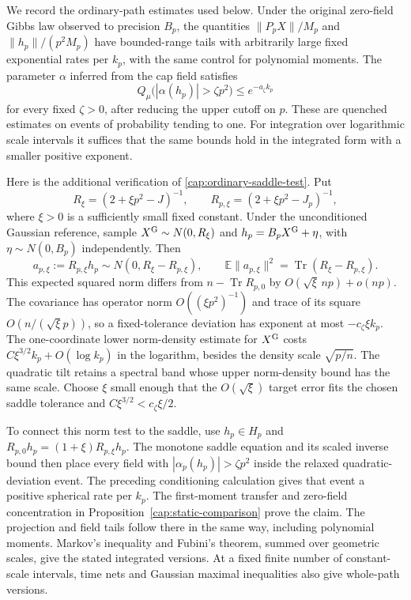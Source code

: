 We record the ordinary-path estimates used below. Under the original
zero-field Gibbs law observed to precision $B_p$, the quantities
$\|P_pX\|/M_p$ and $\|h_p\|/(p^2M_p)$ have bounded-range tails with
arbitrarily large fixed exponential rates per $k_p$, with the same control for
polynomial moments. The parameter $\alpha$ inferred from the cap field
satisfies
\begin{equation}\label{cap:ordinary-saddle-test}
 Q_\mu\big(|\alpha(h_p)|>\zeta p^2\big)
 \le e^{-a_\zeta k_p}
\end{equation}
for every fixed $\zeta>0$, after reducing the upper cutoff on $p$. These are
quenched estimates on events of probability tending to one. For integration
over logarithmic scale intervals it suffices that the same bounds hold in the
integrated form with a smaller positive exponent.

Here is the additional verification of \eqref{cap:ordinary-saddle-test}. Put
\[
 R_\xi=(2+\xi p^2-J)^{-1},\qquad
 R_{p,\xi}=(2+\xi p^2-J_p)^{-1},
\]
where $\xi>0$ is a sufficiently small fixed constant. Under the
unconditioned Gaussian reference, sample $X^{\rm G}\sim N(0,R_\xi)$ and
$h_p=B_pX^{\rm G}+\eta$, with $\eta\sim N(0,B_p)$ independently. Then
\[
 a_{p,\xi}:=R_{p,\xi}h_p\sim N(0,R_\xi-R_{p,\xi}),\qquad
 \mathbb E\|a_{p,\xi}\|^2=\operatorname{Tr}(R_\xi-R_{p,\xi}).
\]
This expected squared norm differs from
$n-\operatorname{Tr}R_{p,0}$ by $O(\sqrt\xi\,np)+o(np)$.
The covariance has operator norm $O((\xi p^2)^{-1})$ and trace of its square
$O(n/(\sqrt\xi p))$, so a fixed-tolerance deviation has exponent at most
$-c_\zeta\xi k_p$. The one-coordinate lower norm-density estimate for
$X^{\rm G}$ costs $C\xi^{3/2}k_p+O(\log k_p)$ in the logarithm, besides
the density scale $\sqrt{p/n}$. The quadratic tilt retains a spectral band
whose upper norm-density bound has the same scale. Choose $\xi$ small
enough that the $O(\sqrt\xi)$ target error fits the chosen saddle tolerance
and $C\xi^{3/2}<c_\zeta\xi/2$.

To connect this norm test to the saddle, use $h_p\in H_p$ and
$R_{p,0}h_p=(1+\xi)R_{p,\xi}h_p$. The monotone saddle equation and its
scaled inverse bound then place every field with
$|\alpha_p(h_p)|>\zeta p^2$ inside the relaxed quadratic-deviation event.
The preceding conditioning calculation gives that event a positive
spherical rate per $k_p$. The first-moment transfer and zero-field concentration in
Proposition~\ref{cap:static-comparison} prove the claim. The projection and
field tails follow there in the same way, including polynomial moments.
Markov's inequality and Fubini's theorem, summed over geometric scales, give
the stated integrated versions. At a fixed finite number of constant-scale
intervals, time nets and Gaussian maximal inequalities also give whole-path
versions.

